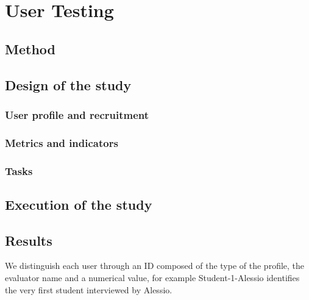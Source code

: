 
\section{User Testing}
\subsection{Method}
\subsection{Design of the study}
    \subsubsection{User profile and recruitment}
    \subsubsection{Metrics and indicators}
    \subsubsection{Tasks}
\subsection{Execution of the study}
\subsection{Results}

    We distinguish each user through an ID composed of the type of the profile, the evaluator name and a numerical value, for example Student-1-Alessio identifies the very first student interviewed by Alessio.
